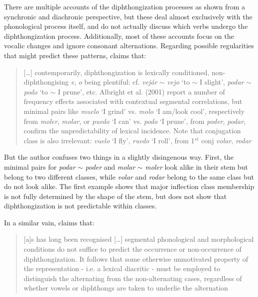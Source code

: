 There are multiple accounts of the diphthongization processes as shown  from a synchronic \autocites{Bellido.1986, Carreira.1991, Harris.1985, Kikuchi.1997} and diachronic \autocite{Wilkinson.1971} perspective, but these deal almost exclusively with the phonological process itself, and do not actually discuss which verbs undergo the diphthongization process. Additionally, most of these accounts focus on the vocalic changes and ignore consonant alternations. Regarding possible regularities that might predict these patterns, \textcite{Roca.2010} claims that:

\begin{quotation}
[\dots] contemporarily, diphthongization is lexically conditioned, non-diph\-thong\-i\-s\-ing \textit{e}, \textit{o} being plentiful: cf. \textit{vejár} $\sim$ \textit{vejo} `to $\sim$ I slight', \textit{podar} $\sim$ \textit{podo} `to $\sim$ I prune', etc. Albright et al. (2001) report a number of frequency effects associated with contextual segmental correlations, but minimal pairs like \textit{muelo} `I grind' vs. \textit{molo} `I am/look cool', respectively from \textit{moler}, \textit{molar}, or \textit{puedo} `I can' vs. \textit{podo} `I prune', from \textit{poder}, \textit{podar}, confirm the unpredictability of lexical incidence. Note that conjugation class is also irrelevant: \textit{vuelo} `I fly', \textit{ruedo} `I roll', from 1$^{st}$ conj \textit{volar}, \textit{rodar} \autocite[423]{Roca.2010}
\end{quotation}

But the author confuses two things in a slightly disingenous way. First, the minimal pairs for \textit{podar} $\sim$ \textit{poder} and \textit{molar} $\sim$ \textit{moler} look alike in their stem but belong to two different classes, while \textit{volar} and \textit{rodar} belong to the same class but do not look alike. The first example shows that major inflection class membership is not fully determined by the shape of the stem, but does not show that diphthongization is not predictable within classes.

In a similar vain, \textcite{Harris.1985} claims that:

\begin{quotation}
[a]s has long been recognised [\dots] segmental phonological  and morphological conditions do not suffice to predict the occurrence or non-occurrence of diphthongization. It follows that some otherwise unmotivated property of the representation - i.e. a lexical diacritic - must be employed to distinguish the alternating from the non-alternating cases, regardless of whether vowels or diphthongs are taken to underlie the alternation \autocite[32]{Harris.1985}
\end{quotation}

